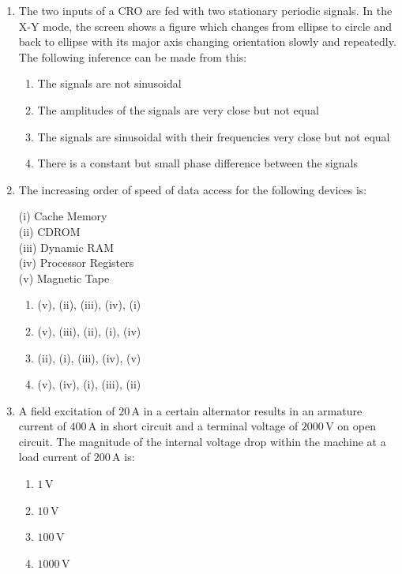 \documentclass[article]{IEEEtran}
\numberwithin{figure}{enumi}
\begin{document}
\begin{enumerate}
\item The two inputs of a CRO are fed with two stationary periodic signals. In the X-Y mode, the screen shows a figure which changes from ellipse to circle and back to ellipse with its major axis changing orientation slowly and repeatedly. The following inference can be made from this:

\begin{enumerate}
\item The signals are not sinusoidal
\item The amplitudes of the signals are very close but not equal
\item The signals are sinusoidal with their frequencies very close but not equal
\item There is a constant but small phase difference between the signals
\end{enumerate}

\item The increasing order of speed of data access for the following devices is:

(i) Cache Memory \\
(ii) CDROM \\
(iii) Dynamic RAM \\
(iv) Processor Registers \\
(v) Magnetic Tape \\

\begin{enumerate}
\item (v), (ii), (iii), (iv), (i)
\item (v), (iii), (ii), (i), (iv)
\item (ii), (i), (iii), (iv), (v)
\item (v), (iv), (i), (iii), (ii)
\end{enumerate}

\item A field excitation of $20 \, \text{A}$ in a certain alternator results in an armature current of $400 \, \text{A}$ in short circuit and a terminal voltage of $2000 \, \text{V}$ on open circuit. The magnitude of the internal voltage drop within the machine at a load current of $200 \, \text{A}$ is:

\begin{enumerate}
\item $1 \, \text{V}$
\item $10 \, \text{V}$
\item $100 \, \text{V}$
\item $1000 \, \text{V}$
\end{enumerate}


\end{enumerate}
\end{document}

